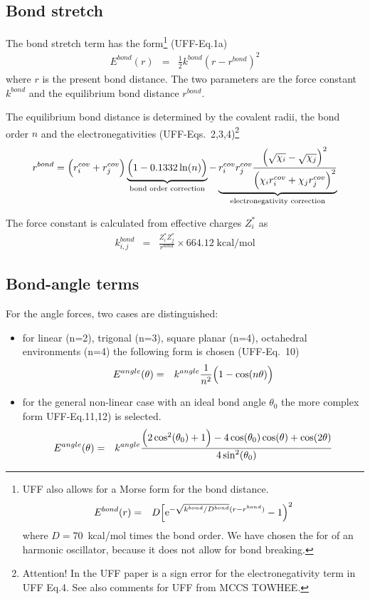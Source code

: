 \documentclass[11pt,a4paper]{report}
\begin{document}
\subsection{Bond stretch}
The bond stretch term has the form\footnote{UFF also allows for a
  Morse form for the bond distance.
\begin{eqnarray}
E^{bond}(r)&=&D\Bigl[\mathrm{e}^{-\sqrt{k^{bond}/D^{bond}}(r-r^{bond})}-1\Bigr)^2
\end{eqnarray}
where $D=70$~kcal/mol times the bond order.  We have chosen the for
of an harmonic oscillator, because it does not allow for bond
breaking.} (UFF-Eq.1a)
\begin{eqnarray}
E^{bond}(r)&=&\frac{1}{2} k^{bond}\left(r-r^{bond}\right)^2
\end{eqnarray}
where $r$ is the present bond distance. The two parameters are the
force constant $k^{bond}$ and the equilibrium bond distance
$r^{bond}$.

The equilibrium bond distance is determined by the covalent radii, the
bond order $n$ and the electronegativities
(UFF-Eqs.~2,3,4)\footnote{Attention! In the UFF paper is a sign error
  for the electronegativity term in UFF Eq.4. See also comments for
  UFF from MCCS TOWHEE.}
\begin{eqnarray}
r^{bond}=\Bigl(r^{cov}_i+r^{cov}_j\Bigr)
\underbrace{\Bigl(1-0.1332\ln(n)\Bigr)}_{\text{bond order correction}}
-
\underbrace{r^{cov}_ir^{cov}_j
\frac{\Bigl(\sqrt{\chi_i}-\sqrt{\chi_j}\Bigr)^2}
{\Bigl(\chi_ir^{cov}_i+\chi_jr^{cov}_j\Bigr)^2}}
_{\text{electronegativity correction}}
\end{eqnarray}


The force constant is calculated from effective charges $Z^*_i$ as
\begin{eqnarray}
k^{bond}_{i,j}&=&\frac{Z^*_iZ^*_j}{r^{bond}}\times 664.12\;\text{kcal/mol}
\end{eqnarray}

\subsection{Bond-angle terms}
For the angle forces, two cases are distinguished: 
\begin{itemize}
\item for linear (n=2), trigonal (n=3), square planar (n=4), 
octahedral environments (n=4) the following form is chosen (UFF-Eq.~10)
\begin{eqnarray}
E^{angle}(\theta)&=&k^{angle}\frac{1}{n^2}\Bigl(1-\cos(n\theta)\Bigr) 
\end{eqnarray}
\item for the general non-linear case with an ideal bond angle $\theta_0$
the more complex form UFF-Eq.11,12) is selected.
\begin{eqnarray}
E^{angle}(\theta)&=&k^{angle}
\frac{\Bigl(2\cos^2(\theta_0)+1\Bigr)
-4\cos(\theta_0)\cos(\theta)
+\cos(2\theta)}{4\sin^2(\theta_0)}
\end{eqnarray}
\end{itemize}
\end{document}
